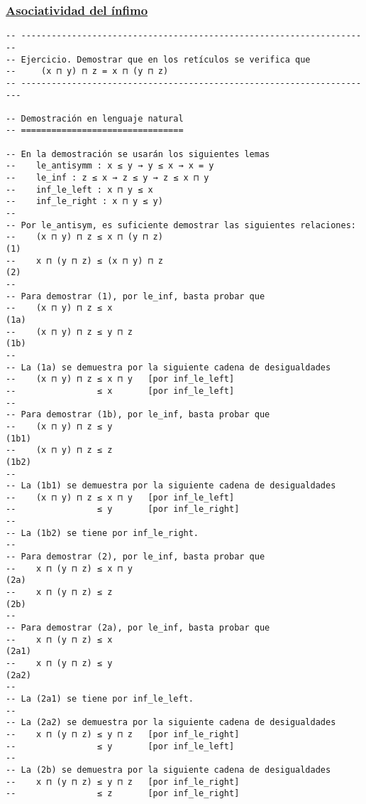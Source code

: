 \subsubsection{\href{./src/Basicos/Asociatividad\_del\_infimo.lean}{Asociatividad del ínfimo}}
\label{sec:org1eafd6f}
\begin{verbatim}
-- ---------------------------------------------------------------------
-- Ejercicio. Demostrar que en los retículos se verifica que
--     (x ⊓ y) ⊓ z = x ⊓ (y ⊓ z)
-- ----------------------------------------------------------------------

-- Demostración en lenguaje natural
-- ================================

-- En la demostración se usarán los siguientes lemas
--    le_antisymm : x ≤ y → y ≤ x → x = y
--    le_inf : z ≤ x → z ≤ y → z ≤ x ⊓ y
--    inf_le_left : x ⊓ y ≤ x
--    inf_le_right : x ⊓ y ≤ y)
--
-- Por le_antisym, es suficiente demostrar las siguientes relaciones:
--    (x ⊓ y) ⊓ z ≤ x ⊓ (y ⊓ z)                                      (1)
--    x ⊓ (y ⊓ z) ≤ (x ⊓ y) ⊓ z                                      (2)
--
-- Para demostrar (1), por le_inf, basta probar que
--    (x ⊓ y) ⊓ z ≤ x                                               (1a)
--    (x ⊓ y) ⊓ z ≤ y ⊓ z                                           (1b)
--
-- La (1a) se demuestra por la siguiente cadena de desigualdades
--    (x ⊓ y) ⊓ z ≤ x ⊓ y   [por inf_le_left]
--                ≤ x       [por inf_le_left]
--
-- Para demostrar (1b), por le_inf, basta probar que
--    (x ⊓ y) ⊓ z ≤ y                                              (1b1)
--    (x ⊓ y) ⊓ z ≤ z                                              (1b2)
--
-- La (1b1) se demuestra por la siguiente cadena de desigualdades
--    (x ⊓ y) ⊓ z ≤ x ⊓ y   [por inf_le_left]
--                ≤ y       [por inf_le_right]
--
-- La (1b2) se tiene por inf_le_right.
--
-- Para demostrar (2), por le_inf, basta probar que
--    x ⊓ (y ⊓ z) ≤ x ⊓ y                                           (2a)
--    x ⊓ (y ⊓ z) ≤ z                                               (2b)
--
-- Para demostrar (2a), por le_inf, basta probar que
--    x ⊓ (y ⊓ z) ≤ x                                              (2a1)
--    x ⊓ (y ⊓ z) ≤ y                                              (2a2)
--
-- La (2a1) se tiene por inf_le_left.
--
-- La (2a2) se demuestra por la siguiente cadena de desigualdades
--    x ⊓ (y ⊓ z) ≤ y ⊓ z   [por inf_le_right]
--                ≤ y       [por inf_le_left]
--
-- La (2b) se demuestra por la siguiente cadena de desigualdades
--    x ⊓ (y ⊓ z) ≤ y ⊓ z   [por inf_le_right]
--                ≤ z       [por inf_le_right]


\end{verbatim}
